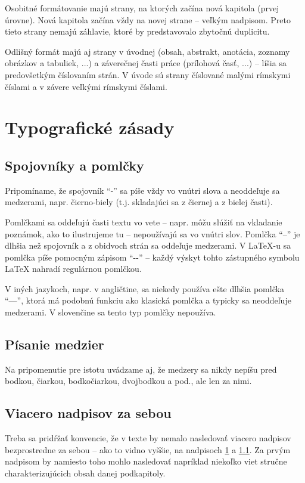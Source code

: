 Osobitné formátovanie majú strany, na ktorých začína nová kapitola (prvej úrovne). Nová kapitola začína vždy na novej strane -- veľkým nadpisom. Preto tieto strany nemajú záhlavie, ktoré by predstavovalo zbytočnú duplicitu.

Odlišný formát majú aj strany v úvodnej (obsah, abstrakt, anotácia, zoznamy obrázkov a tabuliek, ...) a záverečnej časti práce (prílohová časť, ...) -- líšia sa predovšetkým číslovaním strán. V úvode sú strany číslované malými rímskymi číslami a v závere veľkými rímskymi číslami.

\section{Typografické zásady}
\label{sec:typograficke_zasady}


\subsection{Spojovníky a pomlčky}
\label{sec:spojovniky_pomlcky}

Pripomíname, že spojovník \enquote{-} sa píše vždy vo vnútri slova a neoddeľuje sa medzerami, napr. čierno-biely (t.j. skladajúci sa z čiernej a z bielej časti).

Pomlčkami sa oddeľujú časti textu vo vete -- napr. môžu slúžiť na vkladanie poznámok, ako to ilustrujeme tu -- nepoužívajú sa vo vnútri slov. Pomlčka \enquote{--} je dlhšia než spojovník a z obidvoch strán sa oddeľuje medzerami. V LaTeX-u sa pomlčka píše pomocným zápisom \enquote{{-}{-}} -- každý výskyt tohto zástupného symbolu LaTeX nahradí regulárnou pomlčkou.

V iných jazykoch, napr. v angličtine, sa niekedy používa ešte dlhšia pomlčka \enquote{---}, ktorá má podobnú funkciu ako klasická pomlčka a typicky sa neoddeľuje medzerami. V slovenčine sa tento typ pomlčky nepoužíva.

\subsection{Písanie medzier}

Na pripomenutie pre istotu uvádzame aj, že medzery sa nikdy nepíšu pred bodkou, čiarkou, bodkočiarkou, dvojbodkou a pod., ale len za nimi.

\subsection{Viacero nadpisov za sebou}

Treba sa pridŕžať konvencie, že v texte by nemalo nasledovať viacero nadpisov bezprostredne za sebou -- ako to vidno vyššie, na nadpisoch \ref{sec:typograficke_zasady} a \ref{sec:spojovniky_pomlcky}. Za prvým nadpisom by namiesto toho mohlo nasledovať napríklad niekoľko viet stručne charakterizujúcich obsah danej podkapitoly.